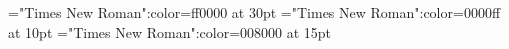 \documentclass[a4paper]{article}
\begin{document}
 
\pagestyle{plain} 
\font\ta="Times New Roman":color=ff0000 at 30pt
\font\tbta="Times New Roman":color=0000ff at 10pt
\font\tctbta="Times New Roman":color=008000 at 15pt

\pagestyle{fancy} 





\end{document}
